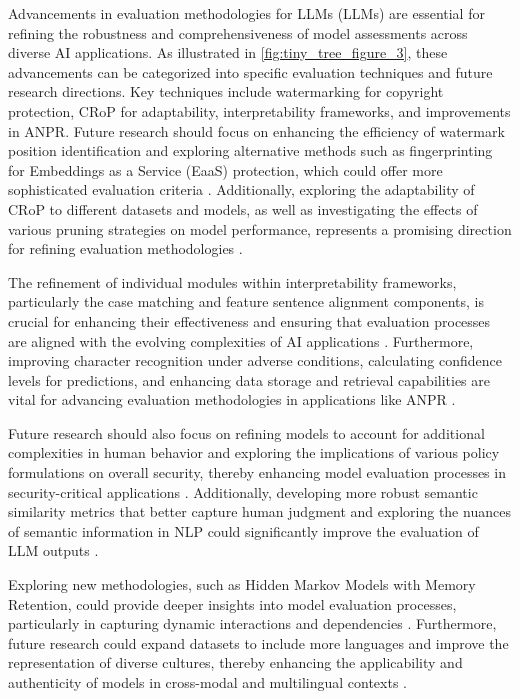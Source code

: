 

Advancements in evaluation methodologies for LLMs (LLMs) are essential for refining the robustness and comprehensiveness of model assessments across diverse AI applications. As illustrated in \autoref{fig:tiny_tree_figure_3}, these advancements can be categorized into specific evaluation techniques and future research directions. Key techniques include watermarking for copyright protection, CRoP for adaptability, interpretability frameworks, and improvements in ANPR. Future research should focus on enhancing the efficiency of watermark position identification and exploring alternative methods such as fingerprinting for Embeddings as a Service (EaaS) protection, which could offer more sophisticated evaluation criteria \cite{wang2024espewrobustcopyrightprotection}. Additionally, exploring the adaptability of CRoP to different datasets and models, as well as investigating the effects of various pruning strategies on model performance, represents a promising direction for refining evaluation methodologies \cite{kaur2024cropcontextwiserobuststatic}.

The refinement of individual modules within interpretability frameworks, particularly the case matching and feature sentence alignment components, is crucial for enhancing their effectiveness and ensuring that evaluation processes are aligned with the evolving complexities of AI applications \cite{lin2023interpretabilityframeworksimilarcase}. Furthermore, improving character recognition under adverse conditions, calculating confidence levels for predictions, and enhancing data storage and retrieval capabilities are vital for advancing evaluation methodologies in applications like ANPR \cite{adak2022automaticnumberplaterecognition}.

Future research should also focus on refining models to account for additional complexities in human behavior and exploring the implications of various policy formulations on overall security, thereby enhancing model evaluation processes in security-critical applications \cite{kammller2020applyingisabelleinsiderframework}. Additionally, developing more robust semantic similarity metrics that better capture human judgment and exploring the nuances of semantic information in NLP could significantly improve the evaluation of LLM outputs \cite{yamshchikov2020styletransferparaphraselookingsensible}.

Exploring new methodologies, such as Hidden Markov Models with Memory Retention, could provide deeper insights into model evaluation processes, particularly in capturing dynamic interactions and dependencies \cite{lathouwers2017memorypaysdiscordhidden}. Furthermore, future research could expand datasets to include more languages and improve the representation of diverse cultures, thereby enhancing the applicability and authenticity of models in cross-modal and multilingual contexts \cite{thapliyal2022crossmodal3600massivelymultilingualmultimodal}.

